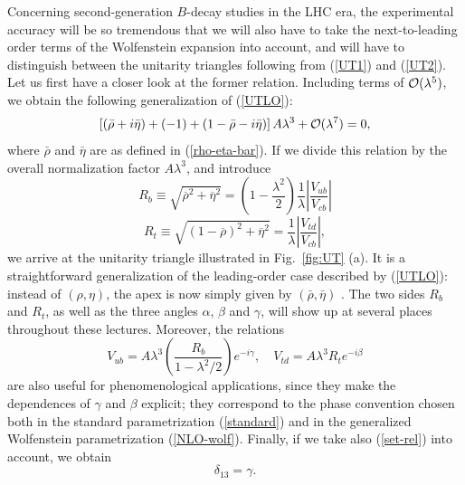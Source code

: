 \documentclass[12pt]{article}
\begin{document}
Concerning second-generation $B$-decay studies in the LHC era, 
the experimental accuracy will be so tremendous that we will also have 
to take the next-to-leading order terms of the Wolfenstein expansion
into account, and will have to distinguish between the unitarity triangles 
following from (\ref{UT1}) and (\ref{UT2}). Let us first have a closer
look at the former relation. Including terms of ${\cal O}(\lambda^5)$, 
we obtain the following generalization of (\ref{UTLO}):
\begin{equation}\label{UT1-NLO}
\left[(\bar\rho+i\bar\eta)+(-1)+(1-\bar\rho-
i\bar\eta)\right]A\lambda^3 +{\cal O}(\lambda^7)=0, 
\end{equation}
where $\bar\rho$ and $\bar\eta$ are as defined in (\ref{rho-eta-bar}). 
If we divide this relation by the overall normalization factor $A\lambda^3$, 
and introduce
\begin{equation}\label{Rb-def}
R_b\equiv\sqrt{\overline{\rho}^2+\overline{\eta}^2}=\left(1-\frac{\lambda^2}{2}
\right)\frac{1}{\lambda}\left|\frac{V_{ub}}{V_{cb}}\right|
\end{equation}
\begin{equation}\label{Rt-def}
R_t\equiv\sqrt{(1-\overline{\rho})^2+\overline{\eta}^2}=
\frac{1}{\lambda}\left|\frac{V_{td}}{V_{cb}}\right|,
\end{equation}
we arrive at the unitarity triangle illustrated in Fig.\ \ref{fig:UT} (a). 
It is a straightforward generalization of the leading-order
case described by (\ref{UTLO}): instead of $(\rho,\eta)$, the apex
is now simply given by $(\bar\rho,\bar\eta)$ \cite{blo}. The two sides 
$R_b$ and $R_t$, as well as the three angles $\alpha$, $\beta$ and $\gamma$, 
will show up at several places throughout these lectures. Moreover, the 
relations
\begin{equation}
V_{ub}=A\lambda^3\left(\frac{R_b}{1-\lambda^2/2}\right)e^{-i\gamma},\quad 
V_{td}=A\lambda^3 R_t e^{-i\beta}
\end{equation}
are also useful for phenomenological applications, since they make the
dependences of $\gamma$ and $\beta$ explicit; they correspond to the
phase convention chosen both in the standard parametrization 
(\ref{standard}) and in the generalized Wolfenstein parametrization 
(\ref{NLO-wolf}). Finally, if we take also (\ref{set-rel}) into account, 
we obtain
\begin{equation}
\delta_{13}=\gamma.
\end{equation}
\end{document}
